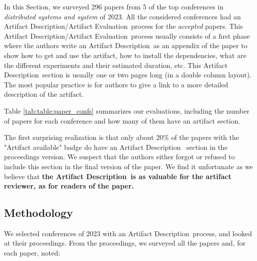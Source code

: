 \documentclass[sigconf,natbib=false]{acmart}
\newcommand{\ad}{Artifact Description}
\newcommand{\aeval}{Artifact Evaluation}
\newcommand{\adae}{\ad/\aeval}
\newcommand{\todo}[1]{{\color{red}{TODO: #1}}}
\begin{document}


In this Section, we surveyed 296 papers from 5 of the top conferences in \emph{distributed systems and system} of 2023.
All the considered conferences had an \adae\ process for the \emph{accepted} papers.
This \adae\ process usually consists of a first phase where the authors write an \ad\ as an appendix of the paper to show how to get and use the artifact, how to install the dependencies, what are the different experiments and their estimated duration, etc.
This \ad\ section is usually one or two pages long (in a double column layout).
The most popular practice is for authors to give a link to a more detailed description of the artifact.

Table \ref{tab:table:paper_confs} summarizes our evaluations, including the number of papers for each conference and how many of them have an artifact section.


The first surprising realization is that only about 20\% of the papers with the "Artifact available" badge do have an \ad~ section in the proceedings version.
We suspect that the authors either forgot or refused to include this section in the final version of the paper.
We find it unfortunate as we believe that \textbf{the \ad\ is as valuable for the artifact reviewer, as for readers of the paper.}

\subsection{Methodology}

We selected conferences of 2023 with an \ad\ process, and looked at their proceedings.
From the proceedings, we surveyed all the papers and, for each paper, noted:
\end{document}
